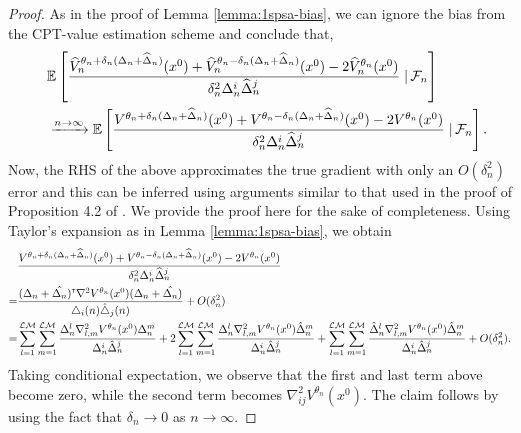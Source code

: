 \begin{proof}
As in the proof of Lemma \ref{lemma:1spsa-bias}, we can ignore the bias from the CPT-value estimation scheme and conclude that,
\begin{align}
    \quad&\mathbb{E}\left[\dfrac{\widehat V_n^{\theta_n+\delta_n(\Delta_n+\widehat\Delta_n)}(x^0) + \widehat V_n^{\theta_n-\delta_n(\Delta_n+\widehat\Delta_n)}(x^0) - 2\widehat V_n^{\theta_n}(x^0)}{\delta_n^2 \Delta_n^i\widehat\Delta_n^j} \left.\right| \mathcal{F}_n\right] \nonumber\\
     &\xrightarrow{n\rightarrow\infty}  \mathbb{E}\left[\dfrac{V^{\theta_n+\delta_n(\Delta_n+\widehat\Delta_n)}(x^0) + V^{\theta_n-\delta_n(\Delta_n+\widehat\Delta_n)}(x^0) - 2V^{\theta_n}(x^0)}{\delta_n^2 \Delta_n^i\widehat\Delta_n^j} \left.\right| \mathcal{F}_n\right].  \label{eq:l21}
\end{align}
Now, the RHS of the above approximates the true gradient with only an $O(\delta_n^2)$ error and this can be inferred using arguments similar to that used in the proof of Proposition 4.2 of \cite{bhatnagar2015simultaneous}. We provide the proof here for the sake of completeness.
Using Taylor's expansion as in Lemma \ref{lemma:1spsa-bias}, we obtain
\begin{align*}
&\dfrac{V^{\theta_n+\delta_n(\Delta_n+\widehat\Delta_n)}(x^0) + V^{\theta_n-\delta_n(\Delta_n+\widehat\Delta_n)}(x^0) - 2V^{\theta_n}(x^0)}{\delta_n^2 \Delta_n^i\widehat\Delta_n^j}\\
=&  \frac{(\Delta_n+\hat{\Delta_n})^\mathsf{\scriptscriptstyle T} \nabla^2 V^{\theta_n}(x^0)(\Delta_n
+\hat{\Delta_n})}{\triangle_i(n)\hat{\triangle}_j(n)}
+ O(\delta_n^2) \\
=& \sum_{l=1}^{\mathcal{L}\mathcal{M}}\sum_{m=1}^{\mathcal{L}\mathcal{M}} \frac{\Delta_n^l\nabla^2_{l,m}V^{\theta_n}(x^0)\Delta_n^m}{\Delta_n^i
\hat{\Delta}_n^j} + 2\sum_{l=1}^{\mathcal{L}\mathcal{M}}\sum_{m=1}^{\mathcal{L}\mathcal{M}} \frac{\Delta_n^l\nabla^2_{l,m}
V^{\theta_n}(x^0)\hat{\Delta}_n^m}{\Delta_n^i
\hat{\Delta}_n^j}+ \sum_{l=1}^{\mathcal{L}\mathcal{M}}\sum_{m=1}^{\mathcal{L}\mathcal{M}} \frac{\hat{\Delta}_n^l\nabla^2_{l,m}V^{\theta_n}(x^0)\hat{\Delta}_n^m}{\Delta_n^i
\hat{\Delta}_n^j} + O(\delta_n^2).
\end{align*}
Taking conditional expectation, we observe that the first and last term above become zero, while the second term becomes $\nabla^2_{ij}
V^{\theta_n}(x^0)$. The claim follows by using the fact that $\delta_n \rightarrow 0$ as $n\rightarrow \infty$.
\end{proof}

